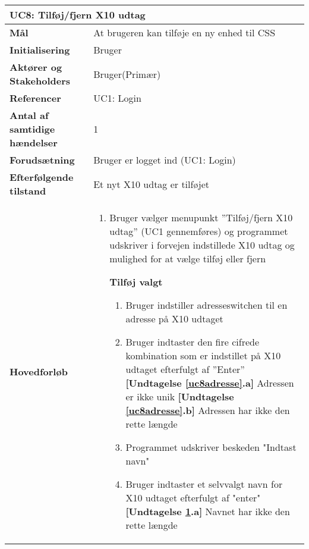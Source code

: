 \begin{table}[H] \centering
	\begin{tabular}{|p{6cm}|p{8cm}|}
	\hline
		\multicolumn{2}{|l|}{\textbf{UC8: Tilføj/fjern X10 udtag}} \\\hline
		
		\textbf{Mål}							&At brugeren kan tilføje en ny enhed til CSS	\\\hline
		\textbf{Initialisering}				&Bruger					 					\\\hline
		\textbf{Aktører og Stakeholders}		&Bruger(Primær)								\\\hline
		\textbf{Referencer}					&UC1: Login									\\\hline
		\textbf{Antal af samtidige hændelser}&1 											\\\hline
		\textbf{Forudsætning}				&Bruger er logget ind (UC1: Login)			\\\hline
		\textbf{Efterfølgende tilstand}		&Et nyt X10 udtag er tilføjet 				\\\hline
		\textbf{Hovedforløb}					
			&\begin{enumerate}
				
				\item Bruger vælger menupunkt ''Tilføj/fjern X10 udtag'' (UC1 gennemføres) og programmet udskriver i forvejen indstillede X10 udtag og mulighed for at vælge tilføj eller fjern
					
				\subitem \textbf{Tilføj valgt}			
				\begin{enumerate}
					\item \label{uc8indstilAdresse} Bruger indstiller adresseswitchen til en adresse på X10 udtaget

					\item \label{uc8adresse} Bruger indtaster den fire cifrede kombination som er indstillet på X10 udtaget efterfulgt af ''Enter''\newline
						\textbf{[Undtagelse \ref{uc8adresse}.a]} Adressen er ikke unik\newline
						\textbf{[Undtagelse \ref{uc8adresse}.b]} Adressen har ikke den rette længde
				
					\item \label{uc8indstilNavn} Programmet udskriver beskeden "Indtast navn"
				
					\item \label{uc8navn} Bruger indtaster et selvvalgt navn for X10 udtaget efterfulgt af "enter"\newline
						\textbf{[Undtagelse \ref{uc8navn}.a]} Navnet har ikke den rette længde
				

\end{enumerate}
\end{enumerate}
\end{tabular}
\end{table}
